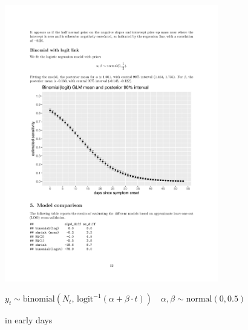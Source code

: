 \documentclass[9pt]{report}
\begin{document}
\includegraphics[width=0.7\textwidth]{img/bayes-logit-glm.pdf}
\vspace*{-3pt}
\begin{subitemize}
\item $y_t \sim \textrm{binomial}\left(N_t, \, \textrm{logit}^{-1}(\alpha +
  \beta \cdot t)\right)
  \quad \alpha, \beta \sim \textrm{normal}(0, 0.5)$
\item {} in early days 
\end{subitemize}


  
\end{document}
